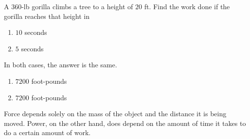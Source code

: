 \begin{exercise}
	A $360$-lb gorilla climbs a tree to a height of $20$ ft. Find the work done if the gorilla reaches that height in
	\renewcommand{\labelenumi}{(\alph{enumi})}
	\begin{enumerate}
		\item $10$ seconds
		\item $5$ seconds
	\end{enumerate}
\end{exercise}
\begin{solution}
	In both cases, the answer is the same.
	\renewcommand{\labelenumi}{(\alph{enumi})}
	\begin{enumerate}
		\item $7200$ foot-pounds
		\item $7200$ foot-pounds
	\end{enumerate}
	Force depends solely on the mass of the object and the distance it is being moved. Power, on the other hand, does depend on the amount of time it takes to do a certain amount of work.
\end{solution}
